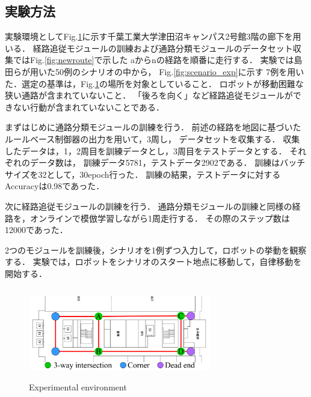 \documentclass{sice-si}
\begin{document}
\subsection{実験方法}
実験環境としてFig.\ref{fig:cit3f}に示す千葉工業大学津田沼キャンパス2号館3階の廊下を用いる．
経路追従モジュールの訓練および通路分類モジュールのデータセット収集ではFig.\ref{fig:newroute}で示した
aからnの経路を順番に走行する．
実験では島田らが用いた50例のシナリオの中から，
Fig.\ref{fig:scenario_exp}に示す
7例を用いた．選定の基準は，Fig.\ref{fig:cit3f}の場所を対象としていること．
ロボットが移動困難な狭い通路が含まれていないこと．
「後ろを向く」など経路追従モジュールができない行動が含まれていないことである．
\par
まずはじめに通路分類モジュールの訓練を行う．
前述の経路を地図に基づいたルールベース制御器の出力を用いて，3周し，
データセットを収集する．
収集したデータは，1，2周目を訓練データとし，3周目をテストデータとする．
それぞれのデータ数は，
訓練データ5781，テストデータ2902である．
訓練はバッチサイズを32として，30epoch行った．
訓練の結果，テストデータに対するAccuracyは0.98であった．\par
次に経路追従モジュールの訓練を行う．
通路分類モジュールの訓練と同様の経路を，オンラインで模倣学習しながら1周走行する．
その際のステップ数は12000であった．
\par
2つのモジュールを訓練後，シナリオを1例ずつ入力して，ロボットの挙動を観察する．
実験では，ロボットをシナリオのスタート地点に移動して，自律移動を開始する．
\begin{figure}[htbp]
    \centering
     \includegraphics[height=40mm,width=80mm]{./figs/cit3f.pdf}
     \caption{Experimental environment}\label{fig:cit3f}
\end{figure}
\end{document}
